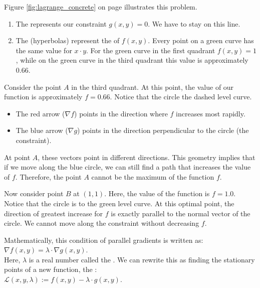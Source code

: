 \noindent
Figure \ref{fig:lagrange_concrete} on page \pageref{fig:lagrange_concrete} illustrates this problem.
\begin{enumerate}
    \item The  represents our constraint $g(x, y) = 0$.  We have to stay on this line.
    \item The  (hyperbolas) represent the  of $f(x,y)$. Every point on a
          green curve has the same value for $x \cdot y$.  For the green curve in the first quadrant $f(x,y) = 1$,
          while on the green curve in the third quadrant this value is approximately $0.66$.          
\end{enumerate}

Consider the point $A$ in the third quadrant. At this point, the value of our function is approximately $f=0.66$.
Notice that the circle  the dashed level curve.
\begin{itemize}
    \item The red arrow ($\nabla f$) points in the direction where $f$ increases most rapidly.
    \item The blue arrow ($\nabla g$) points in the direction perpendicular to the circle (the constraint).
\end{itemize}
At point $A$, these vectors point in different directions. This geometry implies that if we move along the blue
circle, we can still find a path that increases the value of $f$. Therefore, the point $A$ cannot be the
maximum of the function $f$.


Now consider point $B$ at $(1,1)$. Here, the value of the function is $f=1.0$.
Notice that the circle is  to the green level curve.
At this optimal point, the direction of greatest increase for $f$ is exactly parallel to the normal vector of the circle. We cannot move along the constraint without decreasing $f$.

Mathematically, this condition of parallel gradients is written as:
\\[0.2cm]
\hspace*{1.3cm}
$\nabla f(x, y) = \lambda \cdot \nabla g(x, y)$.
\\[0.2cm]
Here, $\lambda$ is a real number called the .
We can rewrite this as finding the stationary points of a new function, the :
\\[0.2cm]
\hspace*{1.3cm}
$\mathcal{L}(x, y, \lambda) := f(x, y) - \lambda \cdot g(x, y)$.

